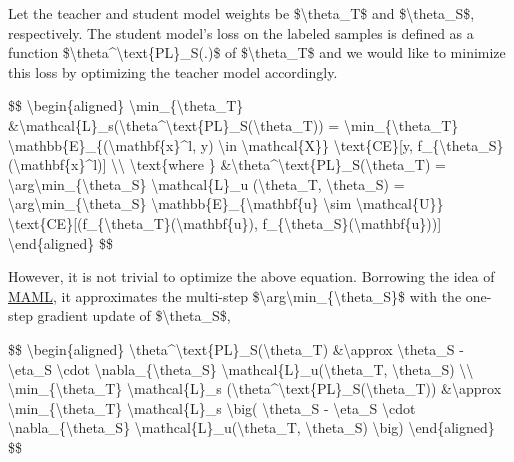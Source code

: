 Let the teacher and student model weights be \$\textbackslash theta\_T\$ and \$\textbackslash theta\_S\$, respectively. The student model's loss on the labeled samples is defined as a function \$\textbackslash theta\^{}\textbackslash text\{PL\}\_S(.)\$ of \$\textbackslash theta\_T\$ and we would like to minimize this loss by optimizing the teacher model accordingly.

\$\$ \textbackslash begin\{aligned\} \textbackslash min\_\{\textbackslash theta\_T\} \&\textbackslash mathcal\{L\}\_s(\textbackslash theta\^{}\textbackslash text\{PL\}\_S(\textbackslash theta\_T)) = \textbackslash min\_\{\textbackslash theta\_T\} \textbackslash mathbb\{E\}\_\{(\textbackslash mathbf\{x\}\^{}l, y) \textbackslash in \textbackslash mathcal\{X\}\} \textbackslash text\{CE\}{[}y, f\_\{\textbackslash theta\_S\}(\textbackslash mathbf\{x\}\^{}l){]} \textbackslash\textbackslash{} \textbackslash text\{where \} \&\textbackslash theta\^{}\textbackslash text\{PL\}\_S(\textbackslash theta\_T) = \textbackslash arg\textbackslash min\_\{\textbackslash theta\_S\} \textbackslash mathcal\{L\}\_u (\textbackslash theta\_T, \textbackslash theta\_S) = \textbackslash arg\textbackslash min\_\{\textbackslash theta\_S\} \textbackslash mathbb\{E\}\_\{\textbackslash mathbf\{u\} \textbackslash sim \textbackslash mathcal\{U\}\} \textbackslash text\{CE\}{[}(f\_\{\textbackslash theta\_T\}(\textbackslash mathbf\{u\}), f\_\{\textbackslash theta\_S\}(\textbackslash mathbf\{u\})){]} \textbackslash end\{aligned\} \$\$

However, it is not trivial to optimize the above equation. Borrowing the idea of \href{https://arxiv.org/abs/1703.03400}{MAML}, it approximates the multi-step \$\textbackslash arg\textbackslash min\_\{\textbackslash theta\_S\}\$ with the one-step gradient update of \$\textbackslash theta\_S\$,

\$\$ \textbackslash begin\{aligned\} \textbackslash theta\^{}\textbackslash text\{PL\}\_S(\textbackslash theta\_T) \&\textbackslash approx \textbackslash theta\_S - \textbackslash eta\_S \textbackslash cdot \textbackslash nabla\_\{\textbackslash theta\_S\} \textbackslash mathcal\{L\}\_u(\textbackslash theta\_T, \textbackslash theta\_S) \textbackslash\textbackslash{} \textbackslash min\_\{\textbackslash theta\_T\} \textbackslash mathcal\{L\}\_s (\textbackslash theta\^{}\textbackslash text\{PL\}\_S(\textbackslash theta\_T)) \&\textbackslash approx \textbackslash min\_\{\textbackslash theta\_T\} \textbackslash mathcal\{L\}\_s \textbackslash big( \textbackslash theta\_S - \textbackslash eta\_S \textbackslash cdot \textbackslash nabla\_\{\textbackslash theta\_S\} \textbackslash mathcal\{L\}\_u(\textbackslash theta\_T, \textbackslash theta\_S) \textbackslash big) \textbackslash end\{aligned\} \$\$

